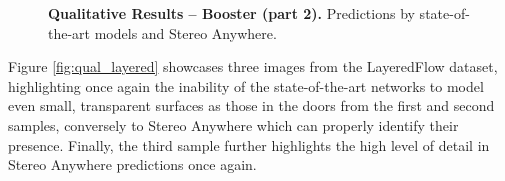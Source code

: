 \documentclass[10pt,twocolumn,letterpaper]{article}
\newcommand{\method}[0]{Stereo Anywhere\xspace}
\begin{document}
\begin{figure}[t]
\begin{tabular}{ccc}
    \end{tabular}\vspace{-0.3cm}
    \caption{\textbf{Qualitative Results -- Booster (part 2).} Predictions by state-of-the-art models and \method.}
    \label{fig:qual_booster_2}\vspace{-0.3cm}
\end{figure}

\clearpage

Figure \ref{fig:qual_layered} showcases three images from the LayeredFlow dataset, highlighting once again the inability of the state-of-the-art networks to model even small, transparent surfaces as those in the doors from the first and second samples, conversely to \method which can properly identify their presence. Finally, the third sample further highlights the high level of detail in \method predictions  once again.
\end{document}
